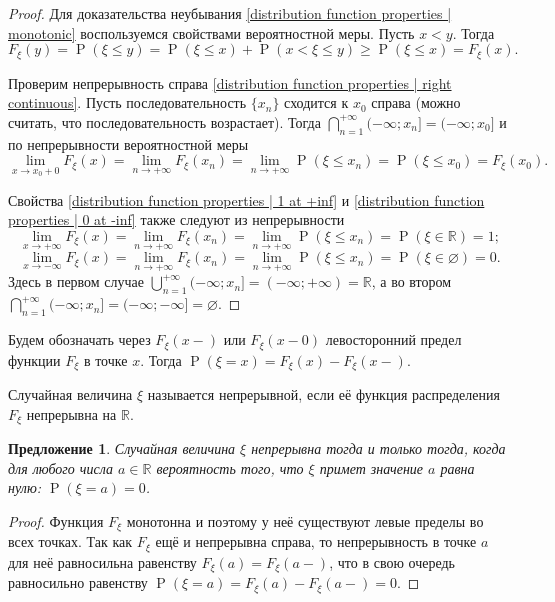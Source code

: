 \documentclass[12pt]{article}
\newtheorem{proposition}[theorem]{Предложение}
\numberwithin{theorem}{section}
\theoremstyle{definition}
\newcommand{\defin}[2]{\hypertarget{#2}{{\color{red} #1}}}
\newcommand{\RR}{\mathbb{R}}
\newcommand{\prob}{\operatorname{P}}
\begin{document}
	\begin{proof}
		Для доказательства неубывания \ref{distribution function properties | monotonic}
		воспользуемся свойствами вероятностной меры. Пусть $ x < y $.
		Тогда
		$$ F_\xi(y) = \prob(\xi \leqslant y) = \prob(\xi \leqslant x) + \prob(x < \xi \leqslant y) 
		\geqslant \prob(\xi \leqslant x) = F_\xi(x). $$
		
		Проверим непрерывность справа \ref{distribution function properties | right continuous}. 
		Пусть последовательность $ \{x_n\} $ сходится к $ x_0 $ справа (можно считать, что последовательность возрастает).
		Тогда $ \bigcap\limits_{n = 1}^{+\infty} (-\infty; x_n] = (-\infty; x_0] $
		и по непрерывности вероятностной меры 
		$$ \lim\limits_{x \to x_0+0} F_{\xi}(x) = \lim\limits_{n \to +\infty} F_{\xi}(x_n) 
		= \lim\limits_{n \to +\infty} \prob(\xi \leqslant x_n) = \prob(\xi \leqslant x_0) = F_{\xi}(x_0). $$
		
		Свойства \ref{distribution function properties | 1 at +inf}
		и \ref{distribution function properties | 0 at -inf} также следуют из непрерывности
		$$ \lim\limits_{x \to +\infty} F_{\xi}(x) = \lim\limits_{n \to +\infty} F_{\xi}(x_n) 
		= \lim\limits_{n \to +\infty} \prob(\xi \leqslant x_n) = \prob(\xi \in \RR) = 1; $$
		$$ \lim\limits_{x \to -\infty} F_{\xi}(x) = \lim\limits_{n \to +\infty} F_{\xi}(x_n) 
		= \lim\limits_{n \to +\infty} \prob(\xi \leqslant x_n) = \prob(\xi \in \varnothing) = 0. $$
		Здесь в первом случае $ \bigcup\limits_{n = 1}^{+\infty} (-\infty; x_n] = (-\infty; +\infty) = \RR $,
		а во втором $ \bigcap\limits_{n = 1}^{+\infty} (-\infty; x_n] = (-\infty; -\infty] = \varnothing $.
	\end{proof}
	
	Будем обозначать через $ F_\xi(x-) $ или $ F_\xi(x-0) $ левосторонний предел функции $ F_\xi $ в точке $ x $.
	Тогда $ \prob(\xi = x) = F_\xi(x) - F_\xi(x-) $. 
	
	Случайная величина $ \xi $ называется \defin{непрерывной}{continuous-random-variable},
	если её функция распределения $ F_\xi $ непрерывна на $ \RR $.
	
	\begin{proposition}
		Случайная величина $ \xi $ непрерывна тогда и только тогда, когда для любого числа $ a \in \RR $
		вероятность того, что $ \xi $ примет значение $ a $ равна нулю: $ \prob(\xi = a) = 0 $.
	\end{proposition}
	
	\begin{proof}
		Функция $ F_\xi $ монотонна и поэтому у неё существуют левые пределы во всех точках.
		Так как $ F_\xi $ ещё и непрерывна справа, то непрерывность в точке $ a $
		для неё равносильна равенству $ F_\xi(a) = F_\xi(a-) $,
		что в свою очередь равносильно равенству $ \prob(\xi = a) = F_\xi(a) - F_\xi(a-) = 0 $.
	\end{proof}
	
\end{document}
